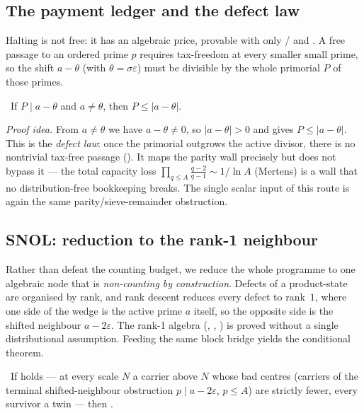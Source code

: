 \subsection{The payment ledger and the defect law}

Halting is not free: it has an algebraic price, provable with only / and
. A free passage to an ordered prime $p$ requires tax-freedom at every smaller small
prime, so the shift $a-\theta$ (with $\theta=\sigma\varepsilon$) must be divisible by the whole
primorial $P$ of those primes.

\begin{theorem}\label{thm:shifted_primorial_bound}
\green{}\ If $P\mid a-\theta$ and $a\ne\theta$, then $P\le|a-\theta|$.
\end{theorem}

\emph{Proof idea.} From $a\ne\theta$ we have $a-\theta\ne0$, so $|a-\theta|>0$ and
 gives $P\le|a-\theta|$. This is the \emph{defect law}: once the
primorial outgrows the active divisor, there is no nontrivial tax-free passage
(). It maps the parity wall precisely but does not bypass it --- the
total capacity loss $\prod_{q\le A}\tfrac{q-2}{q-1}\sim 1/\ln A$ (Mertens) is a wall that no
distribution-free bookkeeping breaks. The single scalar input of this route is again the same
parity/sieve-remainder obstruction.

\subsection{SNOL: reduction to the rank-1 neighbour}

Rather than defeat the counting budget, we reduce the whole programme to one algebraic node that is
\emph{non-counting by construction}. Defects of a product-state are organised by rank, and rank
descent reduces every defect to rank~$1$, where one side of the wedge is the active prime $a$ itself,
so the opposite side is the shifted neighbour $a-2\varepsilon$. The rank-1 algebra
(, , ) is proved
without a single distributional assumption. Feeding the same block bridge yields the conditional
theorem.

\begin{theorem}\label{thm:twin_primes_of_SNOL}
\green{}\ If  holds --- at every scale $N$ a carrier above $N$ whose bad centres
(carriers of the terminal shifted-neighbour obstruction $p\mid a-2\varepsilon$, $p\le A$) are strictly
fewer, every survivor a twin --- then . 
\end{theorem}

